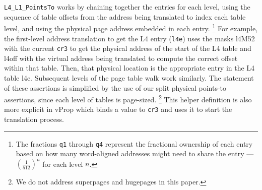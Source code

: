 \lstinline|L4_L1_PointsTo| works by
chaining together the entries for each level, using the sequence of table offsets from the address being translated to index
each table level, and using the physical page address embedded in each entry. \footnote{
  The fractions \lstinline|q1| through \lstinline|q4| represent the fractional ownership of each entry based on how many
  word-aligned addresses might need to share the entry ---  $(\frac{1}{512})^n$ for each level $n$.
}
For example, the first-level address translation to get the L4 entry (\lstinline|l4e|) 
  uses the masks \textsf{l4M52} with the current \lstinline|cr3| to get the physical address of the start of the L4 table
  and \textsf{l4off} with the virtual address being translated to compute the correct offset within that table.
  Then, that physical location is the appropriate entry in the L4 table \textsf{l4e}.
  Subsequent levels of the page table walk work similarly.
The statement of these assertions is simplified by the use of our split physical points-to assertions, since
each level of tables is page-sized. \footnote{We do not address superpages and hugepages in this paper.}
This helper definition is also more explicit in \textsf{vProp} which binds a value to \lstinline|cr3| and uses it to start the translation process.


